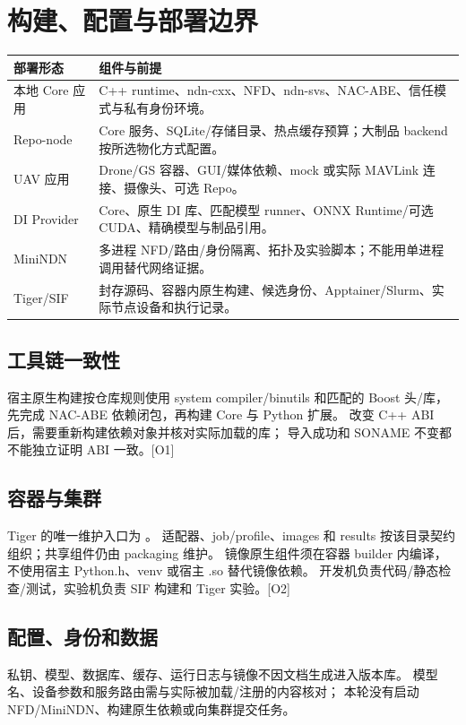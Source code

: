 \section{构建、配置与部署边界}
\begin{tabularx}{\linewidth}{@{}p{32mm}X@{}}
\toprule
部署形态 & 组件与前提 \\
\midrule
本地 Core 应用 & C++ runtime、ndn-cxx、NFD、ndn-svs、NAC-ABE、信任模式与私有身份环境。\\
Repo-node & Core 服务、SQLite/存储目录、热点缓存预算；大制品 backend 按所选物化方式配置。\\
UAV 应用 & Drone/GS 容器、GUI/媒体依赖、mock 或实际 MAVLink 连接、摄像头、可选 Repo。\\
DI Provider & Core、原生 DI 库、匹配模型 runner、ONNX Runtime/可选 CUDA、精确模型与制品引用。\\
MiniNDN & 多进程 NFD/路由/身份隔离、拓扑及实验脚本；不能用单进程调用替代网络证据。\\
Tiger/SIF & 封存源码、容器内原生构建、候选身份、Apptainer/Slurm、实际节点设备和执行记录。\\
\bottomrule
\end{tabularx}

\subsection{工具链一致性}
宿主原生构建按仓库规则使用 system compiler/binutils 和匹配的 Boost 头/库，
先完成 NAC-ABE 依赖闭包，再构建 Core 与 Python 扩展。
改变 C++ ABI 后，需要重新构建依赖对象并核对实际加载的库；
导入成功和 SONAME 不变都不能独立证明 ABI 一致。[O1]

\subsection{容器与集群}
Tiger 的唯一维护入口为 。
适配器、job/profile、images 和 results 按该目录契约组织；共享组件仍由 packaging 维护。
镜像原生组件须在容器 builder 内编译，不使用宿主 Python.h、venv 或宿主 .so 替代镜像依赖。
开发机负责代码/静态检查/测试，实验机负责 SIF 构建和 Tiger 实验。[O2]

\subsection{配置、身份和数据}
私钥、模型、数据库、缓存、运行日志与镜像不因文档生成进入版本库。
模型名、设备参数和服务路由需与实际被加载/注册的内容核对；
本轮没有启动 NFD/MiniNDN、构建原生依赖或向集群提交任务。


